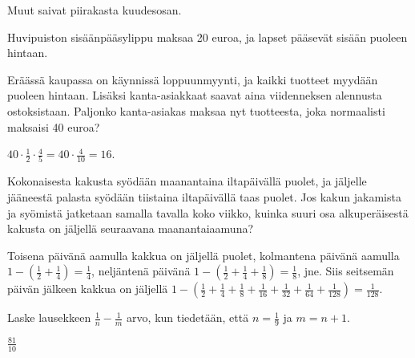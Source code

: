 \begin{tehtavasivu}
\begin{tehtava}
        \begin{vastaus}
            Muut saivat piirakasta kuudesosan.
        \end{vastaus}
    \end{tehtava}
    
\begin{tehtava}
    Huvipuiston sisäänpääsylippu maksaa 20 euroa, ja lapset pääsevät sisään puoleen hintaan.
    \begin{vastaus}
    \end{vastaus}
\end{tehtava}  

\begin{tehtava}
	Eräässä kaupassa on käynnissä loppuunmyynti, ja kaikki tuotteet
    myydään puoleen hintaan. Lisäksi kanta-asiakkaat saavat aina
    viidenneksen alennusta ostoksistaan. Paljonko kanta-asiakas maksaa nyt tuotteesta, joka normaalisti
    maksaisi 40 euroa?
    \begin{vastaus}
		$40\cdot \frac{1}{2} \cdot \frac{4}{5}=40\cdot \frac{4}{10}= 16$. 
	\end{vastaus}
\end{tehtava}
    
\begin{tehtava}
	Kokonaisesta kakusta syödään maanantaina iltapäivällä puolet, ja jäljelle
	jääneestä palasta syödään tiistaina iltapäivällä taas puolet.
	Jos kakun jakamista ja syömistä jatketaan samalla tavalla koko viikko,
	kuinka suuri osa alkuperäisestä kakusta on
	jäljellä seuraavana maanantaiaamuna?
	\begin{vastaus}
		Toisena päivänä aamulla kakkua on jäljellä puolet, kolmantena
		päivänä aamulla
		$1-\left(\frac{1}{2} + \frac{1}{4}\right) = \frac{1}{4}$, 
		neljäntenä päivänä
		$1-\left(\frac{1}{2} + \frac{1}{4} + \frac{1}{8}\right)
		= \frac{1}{8}$, jne.
		Siis seitsemän päivän jälkeen kakkua on jäljellä
		$1-\left(\frac{1}{2} + \frac{1}{4} + \frac{1}{8} +
		\frac{1}{16} + \frac{1}{32} + \frac{1}{64} + \frac{1}{128}\right)
		= \frac{1}{128}$.  
	\end{vastaus}
\end{tehtava}

\begin{tehtava}
	Laske lausekkeen $\frac{1}{n}-\frac{1}{m}$ arvo, kun tiedetään, että $n = \frac{1}{9}$ ja $m=n+1$.
	\begin{vastaus}
		$\frac{81}{10}$
	\end{vastaus}
\end{tehtava}


\end{tehtavasivu}
